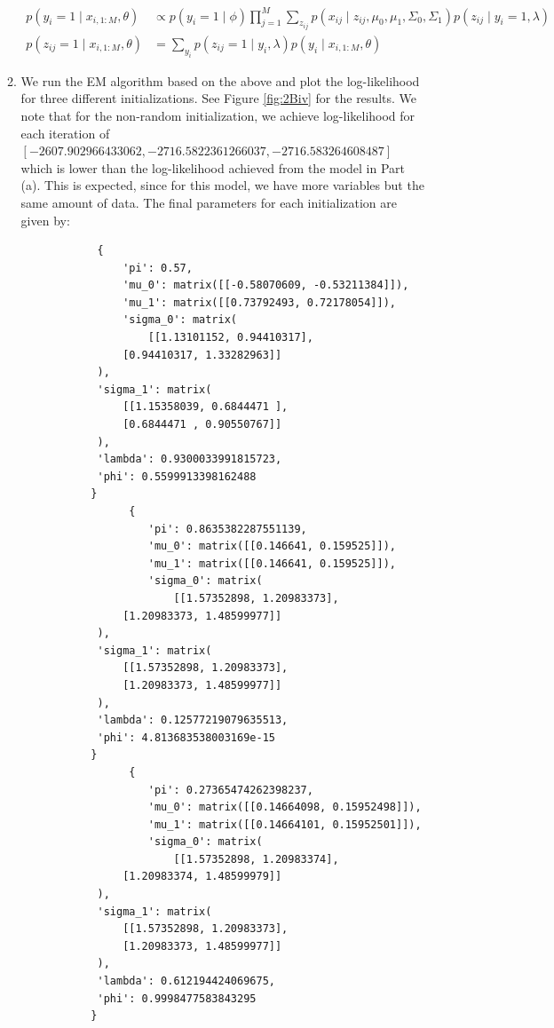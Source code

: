 \documentclass[12pt]{article}
\begin{document}
\begin{enumerate}[label=(\Alph*)]
\begin{enumerate}[label=(\roman*)]
	  	\begin{align*}
	  		p(y_i = 1 \mid x_{i, 1:M}, \theta) &\propto p(y_i = 1\mid \phi) \prod_{j=1}^M\sum_{z_{ij}}p(x_{ij} \mid z_{ij}, \mu_0, \mu_1, \Sigma_0, \Sigma_1)p(z_{ij} \mid y_i = 1, \lambda) \\
	  		p(z_{ij} = 1 \mid x_{i, 1:M}, \theta) &= \sum_{y_i}p(z_{ij} = 1 \mid y_i, \lambda)p(y_i \mid x_{i, 1:M}, \theta)
	  	\end{align*}
  		\item We run the EM algorithm based on the above and plot the log-likelihood for three different initializations. See Figure \ref{fig:2Biv} for the results. We note that for the non-random initialization, we achieve log-likelihood for each iteration of $[-2607.902966433062, -2716.5822361266037, -2716.583264608487]$ which is lower than the log-likelihood achieved from the model in Part (a). This is expected, since for this model, we have more variables but the same amount of data. The final parameters for each initialization are given by:
	  	\begin{verbatim}
	  		{
	  			'pi': 0.57,
	  			'mu_0': matrix([[-0.58070609, -0.53211384]]),
	  			'mu_1': matrix([[0.73792493, 0.72178054]]),
	  			'sigma_0': matrix(
	  				[[1.13101152, 0.94410317],
	        	[0.94410317, 1.33282963]]
	        ),
	        'sigma_1': matrix(
	        	[[1.15358039, 0.6844471 ],
	        	[0.6844471 , 0.90550767]]
	        ),
	        'lambda': 0.9300033991815723,
	        'phi': 0.5599913398162488
	       }
				 {
				 	'pi': 0.8635382287551139,
				 	'mu_0': matrix([[0.146641, 0.159525]]),
				 	'mu_1': matrix([[0.146641, 0.159525]]),
				 	'sigma_0': matrix(
				 		[[1.57352898, 1.20983373],
	        	[1.20983373, 1.48599977]]
	        ),
	        'sigma_1': matrix(
	        	[[1.57352898, 1.20983373],
	        	[1.20983373, 1.48599977]]
	        ),
	        'lambda': 0.12577219079635513,
	        'phi': 4.813683538003169e-15
	       }
				 {
				 	'pi': 0.27365474262398237,
				 	'mu_0': matrix([[0.14664098, 0.15952498]]),
				 	'mu_1': matrix([[0.14664101, 0.15952501]]),
				 	'sigma_0': matrix(
				 		[[1.57352898, 1.20983374],
	        	[1.20983374, 1.48599979]]
	        ),
	        'sigma_1': matrix(
	        	[[1.57352898, 1.20983373],
	        	[1.20983373, 1.48599977]]
	        ),
	        'lambda': 0.612194424069675,
	        'phi': 0.9998477583843295
	       }

	  	\end{verbatim}


\end{enumerate}
\end{enumerate}
\end{document}
